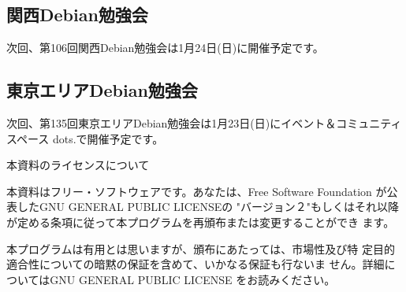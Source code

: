 \documentclass[mingoth,a4paper]{jsarticle}
\begin{document}
\clearpage

\subsection{関西Debian勉強会}
次回、第106回関西Debian勉強会は1月24日(日)に開催予定です。

\subsection{東京エリアDebian勉強会}
次回、第135回東京エリアDebian勉強会は1月23日(日)にイベント＆コミュニティスペース
dots.で開催予定です。

%

\pagebreak

\begin{center}
本資料のライセンスについて
\end{center}

本資料はフリー・ソフトウェアです。あなたは、Free Software
Foundation が公表したGNU GENERAL PUBLIC LICENSEの "バージョン２"もしくはそれ以降
が定める条項に従って本プログラムを再頒布または変更することができ
ます。

本プログラムは有用とは思いますが、頒布にあたっては、市場性及び特
定目的適合性についての暗黙の保証を含めて、いかなる保証も行ないま
せん。詳細についてはGNU GENERAL PUBLIC LICENSE をお読みください。
\end{document}
